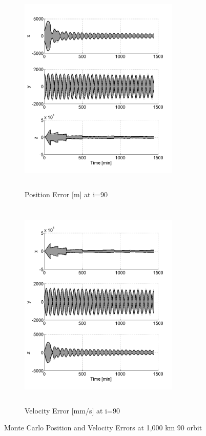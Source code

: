 \documentclass[]{aiaa-tc}%
\begin{document}
%
\begin{figure}[h!]
\centering
\begin{subfigure}{.5\textwidth}
  \centering
  \includegraphics[height=4in,width=3in,keepaspectratio=false]{MC_pos90}
  \caption{Position Error [m] at i=90\degree}
  \label{fig:mcpos90}
\end{subfigure}%
\begin{subfigure}{.5\textwidth} 
  \centering
  \includegraphics[height=4in,width=3in,keepaspectratio=false]{MC_vel90}
  \caption{Velocity Error [mm/s] at i=90\degree}
  \label{fig:coastline}
\end{subfigure}
\caption{Monte Carlo Position and Velocity Errors at 1,000 km 90 \degree orbit}
\label{fig:mcvel90}
\end{figure}
%
\end{document}
